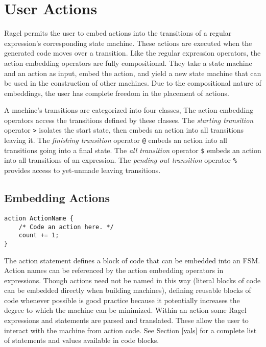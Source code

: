 \documentclass[letterpaper,11pt,oneside]{book}
\newcommand{\verbspace}{\vspace{10pt}}
\begin{document}
\chapter{User Actions}

Ragel permits the user to embed actions into the transitions of a regular
expression's corresponding state machine. These actions are executed when the
generated code moves over a transition.  Like the regular expression operators,
the action embedding operators are fully compositional. They take a state
machine and an action as input, embed the action, and yield a new state machine
that can be used in the construction of other machines. Due to the
compositional nature of embeddings, the user has complete freedom in the
placement of actions.

A machine's transitions are categorized into four classes, The action embedding
operators access the transitions defined by these classes.  The {\em starting
transition} operator \verb|>| isolates the start state, then embeds an action
into all transitions leaving it. The {\em finishing transition} operator
\verb|@| embeds an action into all transitions going into a final state.  The
{\em all transition} operator \verb|$| embeds an action into all transitions of
an expression. The {\em pending out transition} operator \verb|%| provides
access to yet-unmade leaving transitions. 

\section{Embedding Actions}

\begin{verbatim}
action ActionName {
    /* Code an action here. */
    count += 1;
}
\end{verbatim}
\verbspace

The action statement defines a block of code that can be embedded into an FSM.
Action names can be referenced by the action embedding operators in
expressions. Though actions need not be named in this way (literal blocks
of code can be embedded directly when building machines), defining reusable
blocks of code whenever possible is good practice because it potentially increases the
degree to which the machine can be minimized. Within an action some Ragel expressions
and statements are parsed and translated. These allow the user to interact with the machine
from action code. See Section \ref{vals} for a complete list of statements and
values available in code blocks. 
\end{document}
